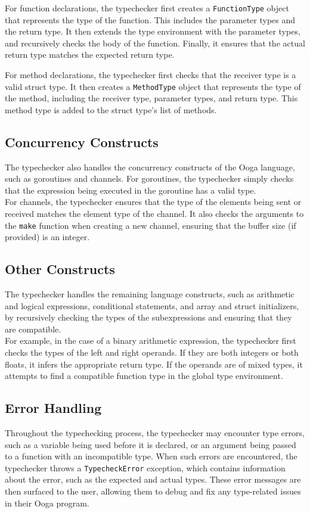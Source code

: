 \documentclass{report}
\begin{document}
For function declarations, the typechecker first creates a \texttt{FunctionType} object that represents the type of the function. This includes the parameter types and the return type. It then extends the type environment with the parameter types, and recursively checks the body of the function. Finally, it ensures that the actual return type matches the expected return type.

For method declarations, the typechecker first checks that the receiver type is a valid struct type. It then creates a \texttt{MethodType} object that represents the type of the method, including the receiver type, parameter types, and return type. This method type is added to the struct type's list of methods.

\subsection{Concurrency Constructs} 
The typechecker also handles the concurrency constructs of the Ooga language, such as goroutines and channels. For goroutines, the typechecker simply checks that the expression being executed in the goroutine has a valid type.\\

For channels, the typechecker ensures that the type of the elements being sent or received matches the element type of the channel. It also checks the arguments to the \texttt{make} function when creating a new channel, ensuring that the buffer size (if provided) is an integer.

\subsection{Other Constructs}
The typechecker handles the remaining language constructs, such as arithmetic and logical expressions, conditional statements, and array and struct initializers, by recursively checking the types of the subexpressions and ensuring that they are compatible.\\

For example, in the case of a binary arithmetic expression, the typechecker first checks the types of the left and right operands. If they are both integers or both floats, it infers the appropriate return type. If the operands are of mixed types, it attempts to find a compatible function type in the global type environment.

\subsection{Error Handling}
Throughout the typechecking process, the typechecker may encounter type errors, such as a variable being used before it is declared, or an argument being passed to a function with an incompatible type. When such errors are encountered, the typechecker throws a \texttt{TypecheckError} exception, which contains information about the error, such as the expected and actual types. These error messages are then surfaced to the user, allowing them to debug and fix any type-related issues in their Ooga program.
\end{document}
